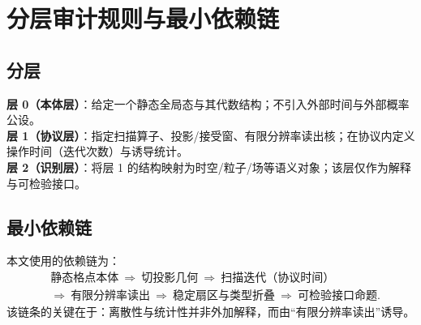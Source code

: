 \section{分层审计规则与最小依赖链}

\subsection{分层}

\textbf{层 0（本体层）}：给定一个静态全局态与其代数结构；不引入外部时间与外部概率公设。\\
\textbf{层 1（协议层）}：指定扫描算子、投影/接受窗、有限分辨率读出核；在协议内定义操作时间（迭代次数）与诱导统计。\\
\textbf{层 2（识别层）}：将层 1 的结构映射为时空/粒子/场等语义对象；该层仅作为解释与可检验接口。

\subsection{最小依赖链}

本文使用的依赖链为：
\[
\begin{aligned}
&\text{静态格点本体}\ \Rightarrow\ \text{切投影几何}\ \Rightarrow\ \text{扫描迭代（协议时间）}\\
&\Rightarrow\ \text{有限分辨率读出}\ \Rightarrow\ \text{稳定扇区与类型折叠}\ \Rightarrow\ \text{可检验接口命题}.
\end{aligned}
\]
该链条的关键在于：离散性与统计性并非外加解释，而由“有限分辨率读出”诱导。


